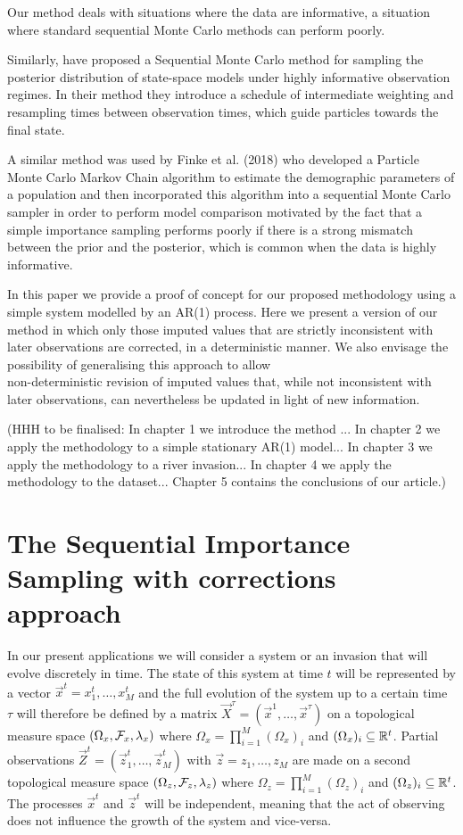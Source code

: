 Our method deals with situations where the data are informative, a situation where standard sequential Monte Carlo methods can perform poorly. 

Similarly, \cite{Del Moral} have proposed a Sequential Monte Carlo method for sampling the posterior distribution of state-space models under highly informative observation regimes. In their method they introduce a schedule of intermediate weighting and resampling times between observation times, which guide particles towards the final state.

A similar method was used by Finke et al. (2018) who developed a Particle Monte Carlo Markov Chain algorithm to estimate the demographic parameters of a population and then incorporated this algorithm into a sequential Monte Carlo sampler in order to perform model comparison motivated by the fact that a simple importance sampling performs poorly if there is a strong mismatch between the prior and the posterior, which is common when the data is highly informative.

In this paper we provide a proof of concept for our proposed methodology using a simple system modelled by an AR(1) process. Here we present a version of our method in which only those imputed values that are strictly inconsistent with later observations are corrected, in a deterministic manner. We also envisage the possibility of generalising this approach to allow \\ non-deterministic revision of imputed values that, while not inconsistent with later observations, can nevertheless be updated in light of new information.

(HHH to be finalised: In chapter 1 we introduce the method ...
In chapter 2 we apply the methodology to a simple stationary AR(1) model...
In chapter 3 we apply the methodology to a river invasion...
In chapter 4 we apply the methodology to the dataset...
Chapter 5 contains the conclusions of our article.)

\section{The Sequential Importance Sampling with corrections approach}

In our present applications we will consider a system or an invasion that will evolve discretely in time. The state of this system at time $t$ will be represented by a vector $\vec{x}^t = x^t_1, \dots, x^t_M$ and the full evolution of the system up to a certain time $\tau$ will therefore be defined by a matrix $\vec{X}^{\tau} = (\vec{x}^1, \dots, \vec{x}^{\tau})$ on a topological measure space $(\Omega_x, \mathcal{F}_x, \lambda_x)$ where $\Omega_x = \prod_{i=1}^M (\Omega_x)_i$ and $(\Omega_x)_i \subseteq \mathbb R^t$. Partial observations $\vec{Z}^t = (\vec{z}^t_1, \dots, \vec{z}^t_M)$ with $\vec{z} = z_1, \dots, z_M$ are made on a second topological measure space $(\Omega_z, \mathcal{F}_z, \lambda_z)$ where $\Omega_z = \prod_{i=1}^M (\Omega_z)_i$ and $(\Omega_z)_i \subseteq \mathbb R^t$. The processes $\vec{x}^t$ and $\vec{z}^t$ will be independent, meaning that the act of observing does not influence the growth of the system and vice-versa. 

